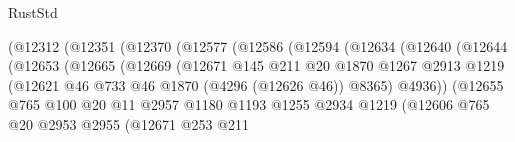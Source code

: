 \begin{lexlean}{RustStd}
\begin{coremodule}
                            (@12312
                              (@12351
                                (@12370
                                  (@12577
                                    (@12586
                                      (@12594
                                        (@12634
                                          (@12640
                                            (@12644
                                              (@12653
                                                (@12665
                                                  (@12669
                                                    (@12671
                                                      @145
                                                      @211
                                                      @20
                                                      @1870
                                                      @1267
                                                      @2913
                                                      @1219
                                                      (@12621
                                                        @46
                                                        @733
                                                        @46
                                                        @1870
                                                        (@4296 (@12626 @46))
                                                        @8365)
                                                      @4936))
                                                  (@12655
                                                    @765
                                                    @100
                                                    @20
                                                    @11
                                                    @2957
                                                    @1180
                                                    @1193
                                                    @1255
                                                    @2934
                                                    @1219
                                                    (@12606
                                                      @765
                                                      @20
                                                      @2953
                                                      @2955
                                                      (@12671
                                                        @253
                                                        @211

\end{coremodule}
\end{lexlean}

